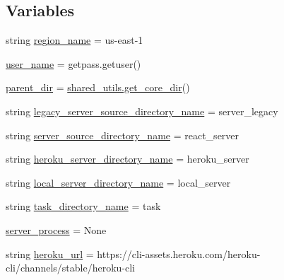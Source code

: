 \subsection*{Variables}
\begin{DoxyCompactItemize}
\item 
string \hyperlink{namespaceparlai_1_1mturk_1_1core_1_1legacy__2018_1_1server__utils_a5798fa3d4465b37f9503829d5142e742}{region\+\_\+name} = \textquotesingle{}us-\/east-\/1\textquotesingle{}
\item 
\hyperlink{namespaceparlai_1_1mturk_1_1core_1_1legacy__2018_1_1server__utils_a5cf85a959193c37dc81be36166b3e122}{user\+\_\+name} = getpass.\+getuser()
\item 
\hyperlink{namespaceparlai_1_1mturk_1_1core_1_1legacy__2018_1_1server__utils_a6a871d2f8e5c0768a82ab8fa2e7fadae}{parent\+\_\+dir} = \hyperlink{namespaceparlai_1_1mturk_1_1core_1_1legacy__2018_1_1shared__utils_a46db6c6ce07c08b84777eaf63cf50608}{shared\+\_\+utils.\+get\+\_\+core\+\_\+dir}()
\item 
string \hyperlink{namespaceparlai_1_1mturk_1_1core_1_1legacy__2018_1_1server__utils_aa06468ef85c1e1d0e5f72387d779eb68}{legacy\+\_\+server\+\_\+source\+\_\+directory\+\_\+name} = \textquotesingle{}server\+\_\+legacy\textquotesingle{}
\item 
string \hyperlink{namespaceparlai_1_1mturk_1_1core_1_1legacy__2018_1_1server__utils_aae18f9658b696c215a3ca0d38511d726}{server\+\_\+source\+\_\+directory\+\_\+name} = \textquotesingle{}react\+\_\+server\textquotesingle{}
\item 
string \hyperlink{namespaceparlai_1_1mturk_1_1core_1_1legacy__2018_1_1server__utils_a0720e56a92f8f89ff045aa75a6218c32}{heroku\+\_\+server\+\_\+directory\+\_\+name} = \textquotesingle{}heroku\+\_\+server\textquotesingle{}
\item 
string \hyperlink{namespaceparlai_1_1mturk_1_1core_1_1legacy__2018_1_1server__utils_ab7183e55cec74bc37a7e4543df809366}{local\+\_\+server\+\_\+directory\+\_\+name} = \textquotesingle{}local\+\_\+server\textquotesingle{}
\item 
string \hyperlink{namespaceparlai_1_1mturk_1_1core_1_1legacy__2018_1_1server__utils_aa52c8a5a61948799ec7d67a30c4e5bee}{task\+\_\+directory\+\_\+name} = \textquotesingle{}task\textquotesingle{}
\item 
\hyperlink{namespaceparlai_1_1mturk_1_1core_1_1legacy__2018_1_1server__utils_a4609fd8d80c5d5567e2b597e568f6f52}{server\+\_\+process} = None
\item 
string \hyperlink{namespaceparlai_1_1mturk_1_1core_1_1legacy__2018_1_1server__utils_ab0df815f2b627fff5c7e552a4f8f921b}{heroku\+\_\+url} = \textquotesingle{}https\+://cli-\/assets.\+heroku.\+com/heroku-\/cli/channels/stable/heroku-\/cli\textquotesingle{}
\end{DoxyCompactItemize}


